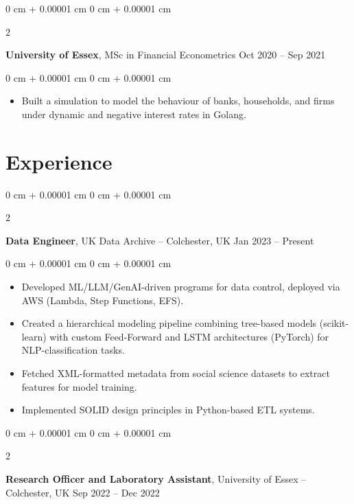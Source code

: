 \documentclass[10pt, letterpaper]{article}
\newenvironment{highlights}{
    \begin{itemize}[
        topsep=0.10 cm,
        parsep=0.10 cm,
        partopsep=0pt,
        itemsep=0pt,
        leftmargin=0 cm + 10pt
    ]
}{
    \end{itemize}
} %
\newenvironment{onecolentry}{
    \begin{adjustwidth}{
        0 cm + 0.00001 cm
    }{
        0 cm + 0.00001 cm
    }
}{
    \end{adjustwidth}
} %
\newenvironment{twocolentry}[2][]{
    \onecolentry
    \def\secondColumn{#2}
    \setcolumnwidth{\fill, 4.5 cm}
    \begin{paracol}{2}
}{
    \switchcolumn \raggedleft \secondColumn
    \end{paracol}
    \endonecolentry
} %
\begin{document}
    
        \begin{twocolentry}{
            Oct 2020 – Sep 2021 
        }
            \textbf{University of Essex}, MSc in Financial Econometrics\end{twocolentry}

        \vspace{0.10 cm}
        \begin{onecolentry}
            \begin{highlights}
            \item Built a simulation to model the behaviour of banks, households, and firms under dynamic and negative interest rates in Golang.
            \end{highlights}
        \end{onecolentry}

    \section{Experience}

        
        \begin{twocolentry}{
            Jan 2023  – Present
        }
            \textbf{Data Engineer}, UK Data Archive -- Colchester, UK\end{twocolentry}

        \vspace{0.10 cm}
        \begin{onecolentry}
            \begin{highlights}
              \item Developed ML/LLM/GenAI-driven programs for data control, deployed via AWS (Lambda, Step Functions, EFS).
              \item Created a hierarchical modeling pipeline combining tree-based models (scikit-learn) with custom Feed-Forward and LSTM architectures (PyTorch) for NLP-classification tasks.
              \item Fetched XML-formatted metadata from social science datasets to extract features for model training.
              \item Implemented SOLID design principles in Python-based ETL systems.
            \end{highlights}
        \end{onecolentry}


        \vspace{0.2 cm}

        \begin{twocolentry}{
            Sep 2022 – Dec 2022
        }
            \textbf{Research Officer and Laboratory Assistant}, University of Essex -- Colchester, UK\end{twocolentry}
\end{document}
